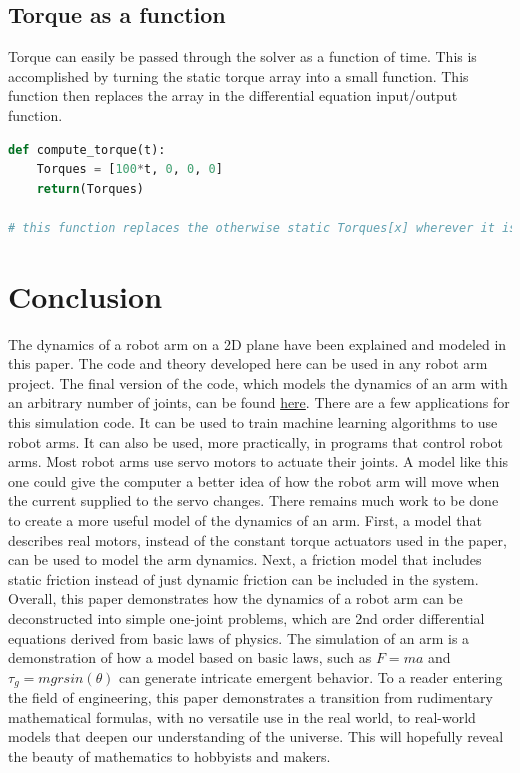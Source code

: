 \documentclass{article}
\begin{document}
\subsection{Torque as a function}
\noindent \justifying Torque can easily be passed through the solver as a function of time. This is accomplished by turning the static torque array into a small function. This function then replaces the array in the differential equation input/output function. 

\begin{lstlisting}[language=Python]
def compute_torque(t):
    Torques = [100*t, 0, 0, 0]
    return(Torques)

# this function replaces the otherwise static Torques[x] wherever it is found in the I/O function. 
\end{lstlisting}

\vspace{24pt}

\section{Conclusion}
\noindent \justifying The dynamics of a robot arm on a 2D plane have been explained and modeled in this paper. The code and theory developed here can be used in any robot arm project. The final version of the code, which models the dynamics of an arm with an arbitrary number of joints, can be found \textcolor{blue}{\href{https://github.com/natebechard/Robotic-Arm-Simulation-From-First-Principles/blob/main/full_arm.py}{here}}. There are a few applications for this simulation code. It can be used to train machine learning algorithms to use robot arms. It can also be used, more practically, in programs that control robot arms. Most robot arms use servo motors to actuate their joints. A model like this one could give the computer a better idea of how the robot arm will move when the current supplied to the servo changes. There remains much work to be done to create a more useful model of the dynamics of an arm. First, a model that describes real motors, instead of the constant torque actuators used in the paper, can be used to model the arm dynamics. Next, a friction model that includes static friction instead of just dynamic friction can be included in the system. Overall, this paper demonstrates how the dynamics of a robot arm can be deconstructed into simple one-joint problems, which are 2nd order differential equations derived from basic laws of physics. The simulation of an arm is a demonstration of how a model based on basic laws, such as $F = ma$ and $\tau_g = mgrsin(\theta)$ can generate intricate emergent behavior. To a reader entering the field of engineering, this paper demonstrates a transition from rudimentary mathematical formulas, with no versatile use in the real world, to real-world models that deepen our understanding of the universe. This will hopefully reveal the beauty of mathematics to hobbyists and makers. 
\end{document}
